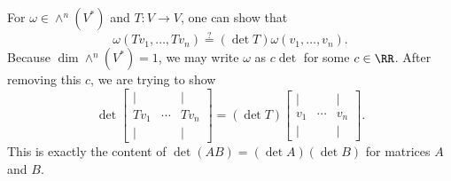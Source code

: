 \documentclass[../notes.tex]{subfiles}
\begin{document}
\begin{remark}
	For $\omega\in\land^n(V^*)$ and $T\colon V\to V$, one can show that
	\[\omega(Tv_1,\ldots,Tv_n)\stackrel?=(\det T)\omega(v_1,\ldots,v_n).\]
	Because $\dim\land^n(V^*)=1$, we may write $\omega$ as $c\det$ for some $c\in\RR$. After removing this $c$, we are trying to show
	\[\det\begin{bmatrix}
		| && | \\
		Tv_1 & \cdots & Tv_n \\
		| && |
	\end{bmatrix}=(\det T)\begin{bmatrix}
		| && | \\
		v_1 & \cdots & v_n \\
		| && |
	\end{bmatrix}.\]
	This is exactly the content of $\det(AB)=(\det A)(\det B)$ for matrices $A$ and $B$.
\end{remark}
\end{document}
